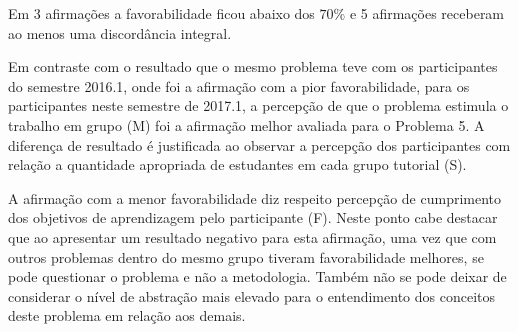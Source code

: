 Em 3 afirmações a favorabilidade ficou abaixo dos $70\%$ e 5 afirmações
receberam ao menos uma discordância integral.

Em contraste com o resultado que o mesmo problema teve com
os participantes do semestre 2016.1, onde foi a afirmação com a
pior favorabilidade, para os participantes neste semestre de
2017.1, a percepção de que o problema estimula o
trabalho em grupo (M) foi a afirmação melhor avaliada
para o Problema 5.
A diferença de resultado é justificada ao observar
a percepção dos participantes com relação a quantidade
apropriada de estudantes em cada grupo tutorial (S).

A afirmação com a menor favorabilidade diz respeito
percepção de cumprimento dos objetivos de aprendizagem
pelo participante (F).
Neste ponto cabe destacar que ao apresentar um resultado
negativo para esta afirmação, uma vez que com outros
problemas dentro do mesmo grupo tiveram favorabilidade
melhores, se pode questionar o problema e não
a metodologia.
Também não se pode deixar de considerar o nível de abstração
mais elevado para o entendimento dos conceitos deste
problema em relação aos demais.


